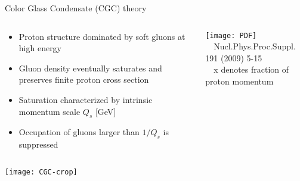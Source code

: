 \documentclass[svgnames]{beamer}
\begin{document}
\begin{frame}{Color Glass Condensate (CGC) theory}

\begin{columns}
 \begin{column}{0.6\textwidth}
  \begin{itemize}
  \item Proton structure dominated by soft gluons at high energy
  \item Gluon density eventually saturates and preserves finite proton cross section
  \item Saturation characterized by intrinsic momentum scale $Q_s$ [GeV]
  \item Occupation of gluons larger than $1/Q_s$ is suppressed
 \end{itemize}
 \end{column}
 \begin{column}{0.4\textwidth}
  \centering
  \texttt{[image: PDF]} \\
  \tiny \vspace{-0.05 in}
  ~~Nucl.Phys.Proc.Suppl. 191 (2009) 5-15\\
  \vspace{0.05 in}
  ~~x denotes fraction of proton momentum
  
 \end{column}
\end{columns}

 \centering
 \vspace{0.15 in}
 \texttt{[image: CGC-crop]} 
\end{frame}
\end{document}
